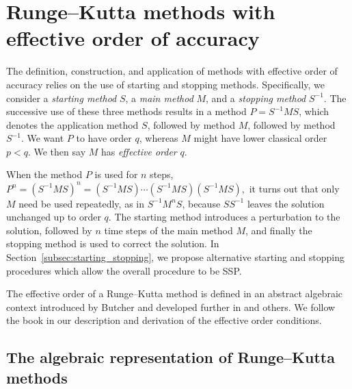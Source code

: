 \section{Runge--Kutta methods with effective order of accuracy}\label{sec:Algebraic_RK}

The definition, construction, and application of methods with
effective order of accuracy relies on the use of starting and stopping
methods.
Specifically, we consider a \emph{starting method} $S$, a \emph{main
  method} $M$, and a \emph{stopping method} $S^{-1}$.
The successive use of these three methods results in a method $P =
S^{-1}MS$, which denotes the application method $S$, followed by
method $M$, followed by method $S^{-1}$.
We want $P$ to have order $q$, whereas $M$ might have lower classical
order $p < q$.
We then say $M$ has \emph{effective order} $q$.

When the method $P$ is used for $n$ steps,
$P^n = (S^{-1}MS)^n = (S^{-1}MS) \cdots (S^{-1}MS) (S^{-1}MS),$
it turns out that only $M$ need be used repeatedly, as in
$S^{-1} M^n S$,
because %
$S S^{-1}$ leaves the solution unchanged up to order $q$.
The starting method introduces a perturbation to the solution,
followed by $n$ time steps of the main method $M$, and finally the
stopping method is used to correct the solution.
In Section~\ref{subsec:starting_stopping}, we propose alternative
starting and stopping procedures which allow the overall procedure to
be SSP.

The effective order of a Runge--Kutta method is defined in an abstract 
algebraic context introduced by Butcher \cite{Butcher1969} and developed 
further in \cite{Butcher1972, Hairer1974, Butcher1996, Butcher1998} and 
others.
We follow the book \cite{Butcher2008_book} in our description and
derivation of the effective order conditions.


\subsection{The algebraic representation of Runge--Kutta methods}\label{subsec:Algebraic_representation}


